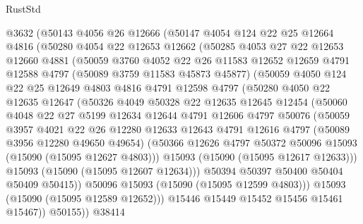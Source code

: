 \begin{lexlean}{RustStd}
\begin{coremodule}
    @3632
    (@50143
      @4056
      @26
      @12666
      (@50147
        @4054
        @124
        @22
        @25
        @12664
        @4816
        (@50280
          @4054
          @22
          @12653
          @12662
          (@50285
            @4053
            @27
            @22
            @12653
            @12660
            @4881
            (@50059
              @3760
              @4052
              @22
              @26
              @11583
              @12652
              @12659
              @4791
              @12588
              @4797
              (@50089 @3759 @11583 @45873 @45877)
              (@50059
                @4050
                @124
                @22
                @25
                @12649
                @4803
                @4816
                @4791
                @12598
                @4797
                (@50280
                  @4050
                  @22
                  @12635
                  @12647
                  (@50326
                    @4049
                    @50328
                    @22
                    @12635
                    @12645
                    @12454
                    (@50060
                      @4048
                      @22
                      @27
                      @5199
                      @12634
                      @12644
                      @4791
                      @12606
                      @4797
                      @50076
                      (@50059
                        @3957
                        @4021
                        @22
                        @26
                        @12280
                        @12633
                        @12643
                        @4791
                        @12616
                        @4797
                        (@50089 @3956 @12280 @49650 @49654)
                        (@50366 @12626 @4797 @50372 @50096 @15093 (@15090 (@15095 @12627 @4803)))
                        @15093
                        (@15090 (@15095 @12617 @12633)))
                      @15093
                      (@15090 (@15095 @12607 @12634)))
                    @50394
                    @50397
                    @50400
                    @50404
                    @50409
                    @50415))
                @50096
                @15093
                (@15090 (@15095 @12599 @4803)))
              @15093
              (@15090 (@15095 @12589 @12652)))
            @15446
            @15449
            @15452
            @15456
            @15461
            @15467))
        @50155))
    @38414

\end{coremodule}
\end{lexlean}
